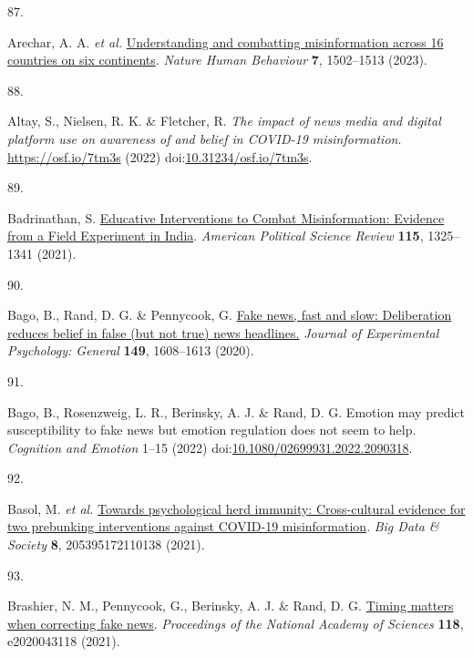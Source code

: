 \documentclass[
  man]{apa6}
\newlength{\cslhangindent}
\newlength{\csllabelwidth}
\newenvironment{CSLReferences}[2] %
 {\begin{list}{}{%
  \setlength{\itemindent}{0pt}
  \setlength{\leftmargin}{0pt}
  \setlength{\parsep}{0pt}
  \ifodd #1
   \setlength{\leftmargin}{\cslhangindent}
   \setlength{\itemindent}{-1\cslhangindent}
  \fi
  \setlength{\itemsep}{#2\baselineskip}}}
 {\end{list}}
\newcommand{\CSLLeftMargin}[1]{\parbox[t]{\csllabelwidth}{\strut#1\strut}}
\newcommand{\CSLRightInline}[1]{\parbox[t]{\linewidth - \csllabelwidth}{\strut#1\strut}}
\begin{document}
\begin{CSLReferences}{0}{0}
\CSLLeftMargin{87. }%
\CSLRightInline{*Arechar, A. A. \emph{et al.} \href{https://doi.org/10.1038/s41562-023-01641-6}{Understanding and combatting misinformation across 16 countries on six continents}. \emph{Nature Human Behaviour} \textbf{7}, 1502--1513 (2023).}

\CSLLeftMargin{88. }%
\CSLRightInline{*Altay, S., Nielsen, R. K. \& Fletcher, R. \emph{The impact of news media and digital platform use on awareness of and belief in COVID-19 misinformation}. \url{https://osf.io/7tm3s} (2022) doi:\href{https://doi.org/10.31234/osf.io/7tm3s}{10.31234/osf.io/7tm3s}.}

\CSLLeftMargin{89. }%
\CSLRightInline{*Badrinathan, S. \href{https://doi.org/10.1017/S0003055421000459}{Educative Interventions to Combat Misinformation: Evidence from a Field Experiment in India}. \emph{American Political Science Review} \textbf{115}, 1325--1341 (2021).}

\CSLLeftMargin{90. }%
\CSLRightInline{*Bago, B., Rand, D. G. \& Pennycook, G. \href{https://doi.org/10.1037/xge0000729}{Fake news, fast and slow: Deliberation reduces belief in false (but not true) news headlines.} \emph{Journal of Experimental Psychology: General} \textbf{149}, 1608--1613 (2020).}

\CSLLeftMargin{91. }%
\CSLRightInline{*Bago, B., Rosenzweig, L. R., Berinsky, A. J. \& Rand, D. G. Emotion may predict susceptibility to fake news but emotion regulation does not seem to help. \emph{Cognition and Emotion} 1--15 (2022) doi:\href{https://doi.org/10.1080/02699931.2022.2090318}{10.1080/02699931.2022.2090318}.}

\CSLLeftMargin{92. }%
\CSLRightInline{*Basol, M. \emph{et al.} \href{https://doi.org/10.1177/20539517211013868}{Towards psychological herd immunity: Cross-cultural evidence for two prebunking interventions against COVID-19 misinformation}. \emph{Big Data \& Society} \textbf{8}, 205395172110138 (2021).}

\CSLLeftMargin{93. }%
\CSLRightInline{*Brashier, N. M., Pennycook, G., Berinsky, A. J. \& Rand, D. G. \href{https://doi.org/10.1073/pnas.2020043118}{Timing matters when correcting fake news}. \emph{Proceedings of the National Academy of Sciences} \textbf{118}, e2020043118 (2021).}


\end{CSLReferences}
\end{document}
